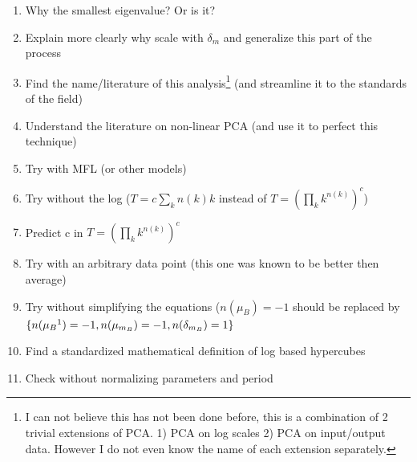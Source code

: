\documentclass[12pt]{article}
\begin{document}
\begin{enumerate}
\item Why the smallest eigenvalue? Or is it?
\item Explain more clearly why scale with $\delta_m$ and generalize this part of the process
\item Find the name/literature of this analysis\footnote{I can not believe this has not been done before, this is a combination of 2 trivial extensions of PCA. 1) PCA on log scales 2) PCA on input/output data. However I do not even know the name of each extension separately.} (and streamline it to the standards of the field)
\item Understand the literature on non-linear PCA (and use it to perfect this technique)
\item Try with MFL (or other models)
\item Try without the log ($T=c\sum_k n(k)k$ instead of $T=(\prod_k k^{n(k)})^c$)
\item Predict c in $T=(\prod_k k^{n(k)})^c$
\item Try with an arbitrary data point (this one was known to be better then average)
\item Try without simplifying the equations ($n(\mu_B)=-1$ should be replaced by $\{n(\mu_{B}\footnotemark)=-1, n(\mu_{m_B})=-1, n(\delta_{m_B})=1\}$
\item Find a standardized mathematical definition of log based hypercubes
\item Check without normalizing parameters and period
\end{enumerate}
\end{document}
